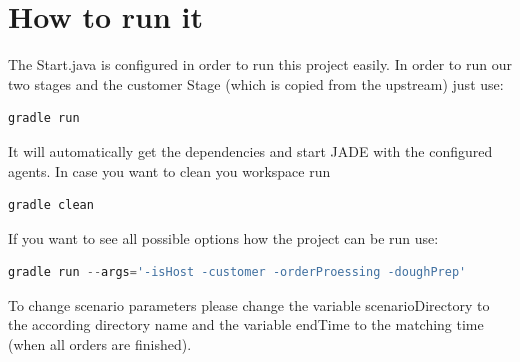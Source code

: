 \documentclass[10pt,a4paper]{article}
\begin{document}
	\section{How to run it}
	The Start.java is configured in order to run this project easily.
	In order to run our two stages and the customer Stage (which is copied from the upstream) just use:

	\begin{lstlisting}[language=Groovy,caption = Gradle run,frame=single, label={gradlerun} ]
	gradle run
	\end{lstlisting}

	\noindent It will automatically get the dependencies and start JADE with the configured agents.
	In case you want to clean you workspace run

	\begin{lstlisting}[language=Groovy,caption = Gradle clean,frame=single, label={gradleclean} ]
	gradle clean
	\end{lstlisting}
	If you want to see all possible options how the project can be run use:
	\begin{lstlisting}[language=Groovy,caption = Gradle run args,frame=single, label={gradlerunargs} ]
	gradle run --args='-isHost -customer -orderProessing -doughPrep'
	\end{lstlisting}
    To change scenario parameters please change the variable scenarioDirectory to the according directory name and the variable endTime to the matching time (when all
    orders are finished).
\end{document}
